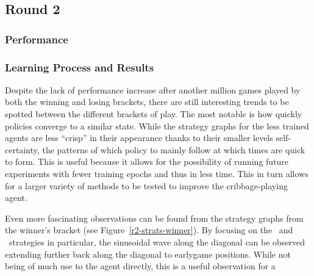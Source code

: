 
\subsection{Round 2}

\subsubsection{Performance}








\subsubsection{Learning Process and Results}


Despite the lack of performance increase after another million games played by
both the winning and losing brackets,
there are still interesting trends to be spotted between the different brackets
of play.
%
The most notable is how quickly policies converge to a similar state.
%
While the strategy graphs for the less trained agents are less ``crisp''
in their appearance thanks to their smaller levels self-certainty,
the patterns of which policy to mainly follow at which times
are quick to form.
%
This is useful because it allows for the possibility of running future
experiments with fewer training epochs and thus in less time.
%
This in turn allows for a larger variety of methods to be tested to improve
the cribbage-playing agent.

Even more fascinating observations can be found from the strategy graphs
from the winner's bracket (see Figure~\ref{r2-strats-winner}).
%
By focusing on the \handmaxmin\ and \handmaxavg\ strategies in particular,
the sinusoidal wave along the diagonal can be observed extending further
back along the diagonal to earlygame positions.
%
While not being of much use to the agent directly,
this is a useful observation for a 













